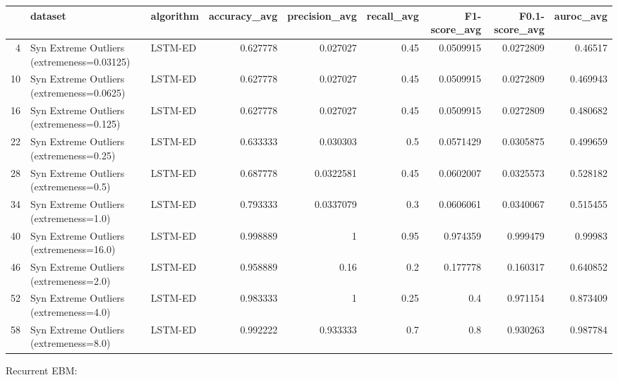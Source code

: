 \begin{tabular}{rllrrrrrr}
\hline
    & dataset                                    & algorithm   &   accuracy\_avg &   precision\_avg &   recall\_avg &   F1-score\_avg &   F0.1-score\_avg &   auroc\_avg \\
\hline
  4 & Syn Extreme Outliers (extremeness=0.03125) & LSTM-ED     &       0.627778 &       0.027027  &         0.45 &      0.0509915 &        0.0272809 &    0.46517  \\
 10 & Syn Extreme Outliers (extremeness=0.0625)  & LSTM-ED     &       0.627778 &       0.027027  &         0.45 &      0.0509915 &        0.0272809 &    0.469943 \\
 16 & Syn Extreme Outliers (extremeness=0.125)   & LSTM-ED     &       0.627778 &       0.027027  &         0.45 &      0.0509915 &        0.0272809 &    0.480682 \\
 22 & Syn Extreme Outliers (extremeness=0.25)    & LSTM-ED     &       0.633333 &       0.030303  &         0.5  &      0.0571429 &        0.0305875 &    0.499659 \\
 28 & Syn Extreme Outliers (extremeness=0.5)     & LSTM-ED     &       0.687778 &       0.0322581 &         0.45 &      0.0602007 &        0.0325573 &    0.528182 \\
 34 & Syn Extreme Outliers (extremeness=1.0)     & LSTM-ED     &       0.793333 &       0.0337079 &         0.3  &      0.0606061 &        0.0340067 &    0.515455 \\
 40 & Syn Extreme Outliers (extremeness=16.0)    & LSTM-ED     &       0.998889 &       1         &         0.95 &      0.974359  &        0.999479  &    0.99983  \\
 46 & Syn Extreme Outliers (extremeness=2.0)     & LSTM-ED     &       0.958889 &       0.16      &         0.2  &      0.177778  &        0.160317  &    0.640852 \\
 52 & Syn Extreme Outliers (extremeness=4.0)     & LSTM-ED     &       0.983333 &       1         &         0.25 &      0.4       &        0.971154  &    0.873409 \\
 58 & Syn Extreme Outliers (extremeness=8.0)     & LSTM-ED     &       0.992222 &       0.933333  &         0.7  &      0.8       &        0.930263  &    0.987784 \\
\hline
\end{tabular}

Recurrent EBM:

